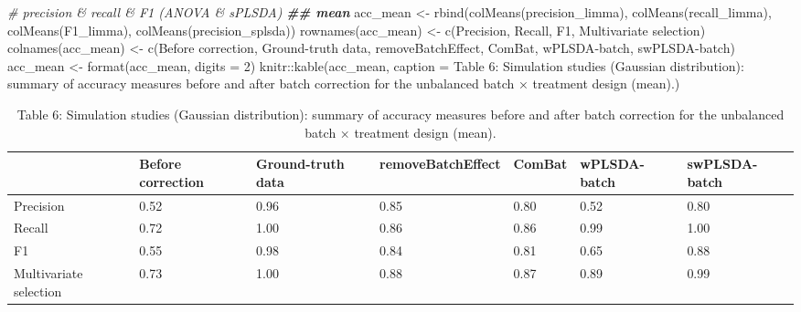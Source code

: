 \documentclass[
]{book}
\newenvironment{Shaded}{\begin{snugshade}}{\end{snugshade}}
\newcommand{\AttributeTok}[1]{\textcolor[rgb]{0.77,0.63,0.00}{#1}}
\newcommand{\CommentTok}[1]{\textcolor[rgb]{0.56,0.35,0.01}{\textit{#1}}}
\newcommand{\DecValTok}[1]{\textcolor[rgb]{0.00,0.00,0.81}{#1}}
\newcommand{\DocumentationTok}[1]{\textcolor[rgb]{0.56,0.35,0.01}{\textbf{\textit{#1}}}}
\newcommand{\FunctionTok}[1]{\textcolor[rgb]{0.00,0.00,0.00}{#1}}
\newcommand{\NormalTok}[1]{#1}
\newcommand{\OtherTok}[1]{\textcolor[rgb]{0.56,0.35,0.01}{#1}}
\newcommand{\SpecialCharTok}[1]{\textcolor[rgb]{0.00,0.00,0.00}{#1}}
\newcommand{\StringTok}[1]{\textcolor[rgb]{0.31,0.60,0.02}{#1}}
\begin{document}
\begin{Shaded}
\begin{Highlighting}[]
\CommentTok{\# precision \& recall \& F1 (ANOVA \& sPLSDA)}
\DocumentationTok{\#\# mean}
\NormalTok{acc\_mean }\OtherTok{\textless{}{-}} \FunctionTok{rbind}\NormalTok{(}\FunctionTok{colMeans}\NormalTok{(precision\_limma), }\FunctionTok{colMeans}\NormalTok{(recall\_limma), }
                  \FunctionTok{colMeans}\NormalTok{(F1\_limma), }\FunctionTok{colMeans}\NormalTok{(precision\_splsda))}
\FunctionTok{rownames}\NormalTok{(acc\_mean) }\OtherTok{\textless{}{-}} \FunctionTok{c}\NormalTok{(}\StringTok{\textquotesingle{}Precision\textquotesingle{}}\NormalTok{, }\StringTok{\textquotesingle{}Recall\textquotesingle{}}\NormalTok{, }\StringTok{\textquotesingle{}F1\textquotesingle{}}\NormalTok{, }\StringTok{\textquotesingle{}Multivariate selection\textquotesingle{}}\NormalTok{)}
\FunctionTok{colnames}\NormalTok{(acc\_mean) }\OtherTok{\textless{}{-}} \FunctionTok{c}\NormalTok{(}\StringTok{\textquotesingle{}Before correction\textquotesingle{}}\NormalTok{, }\StringTok{\textquotesingle{}Ground{-}truth data\textquotesingle{}}\NormalTok{, }
                        \StringTok{\textquotesingle{}removeBatchEffect\textquotesingle{}}\NormalTok{, }\StringTok{\textquotesingle{}ComBat\textquotesingle{}}\NormalTok{, }
                        \StringTok{\textquotesingle{}wPLSDA{-}batch\textquotesingle{}}\NormalTok{, }\StringTok{\textquotesingle{}swPLSDA{-}batch\textquotesingle{}}\NormalTok{)}
\NormalTok{acc\_mean }\OtherTok{\textless{}{-}} \FunctionTok{format}\NormalTok{(acc\_mean, }\AttributeTok{digits =} \DecValTok{2}\NormalTok{)}
\NormalTok{knitr}\SpecialCharTok{::}\FunctionTok{kable}\NormalTok{(acc\_mean, }\AttributeTok{caption =} \StringTok{\textquotesingle{}Table 6: Simulation studies (Gaussian distribution): summary of accuracy measures before and after batch correction for the unbalanced batch × treatment design (mean).\textquotesingle{}}\NormalTok{)}
\end{Highlighting}
\end{Shaded}

\begin{table}

\caption{\label{tab:unnamed-chunk-107}Table 6: Simulation studies (Gaussian distribution): summary of accuracy measures before and after batch correction for the unbalanced batch × treatment design (mean).}
\centering
\begin{tabular}[t]{l|l|l|l|l|l|l}
\hline
  & Before correction & Ground-truth data & removeBatchEffect & ComBat & wPLSDA-batch & swPLSDA-batch\\
\hline
Precision & 0.52 & 0.96 & 0.85 & 0.80 & 0.52 & 0.80\\
\hline
Recall & 0.72 & 1.00 & 0.86 & 0.86 & 0.99 & 1.00\\
\hline
F1 & 0.55 & 0.98 & 0.84 & 0.81 & 0.65 & 0.88\\
\hline
Multivariate selection & 0.73 & 1.00 & 0.88 & 0.87 & 0.89 & 0.99\\
\hline
\end{tabular}
\end{table}
\end{document}
